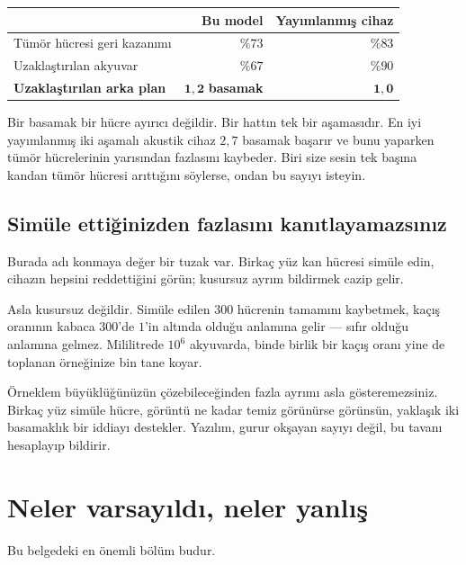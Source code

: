 \documentclass[11pt,a4paper]{article}
\begin{document}
\begin{center}\small
\begin{tabular}{lrr}
\toprule
& Bu model & Yayımlanmış cihaz \\
\midrule
Tümör hücresi geri kazanımı & $\%73$ & $\%83$ \\
Uzaklaştırılan akyuvar & $\%67$ & $\%90$ \\
\textbf{Uzaklaştırılan arka plan} & $\mathbf{1,2}$ \textbf{basamak}
& $\mathbf{1,0}$ \\
\bottomrule
\end{tabular}
\end{center}

\begin{plain}
Bir basamak bir hücre ayırıcı değildir. Bir hattın tek bir aşamasıdır. En iyi
yayımlanmış iki aşamalı akustik cihaz $2,7$ basamak başarır ve bunu yaparken
tümör hücrelerinin yarısından fazlasını kaybeder. Biri size sesin tek başına
kandan tümör hücresi arıttığını söylerse, ondan bu sayıyı isteyin.
\end{plain}

\subsection*{Simüle ettiğinizden fazlasını kanıtlayamazsınız}

Burada adı konmaya değer bir tuzak var. Birkaç yüz kan hücresi simüle edin,
cihazın hepsini reddettiğini görün; kusursuz ayrım bildirmek cazip gelir.

Asla kusursuz değildir. Simüle edilen 300 hücrenin tamamını kaybetmek, kaçış
oranının kabaca $300$'de $1$'in altında olduğu anlamına gelir --- sıfır olduğu
anlamına gelmez. Mililitrede $10^6$ akyuvarda, binde birlik bir kaçış oranı yine
de toplanan örneğinize bin tane koyar.

\begin{keybox}
Örneklem büyüklüğünüzün çözebileceğinden fazla ayrımı asla gösteremezsiniz.
Birkaç yüz simüle hücre, görüntü ne kadar temiz görünürse görünsün, yaklaşık iki
basamaklık bir iddiayı destekler. Yazılım, gurur okşayan sayıyı değil, bu tavanı
hesaplayıp bildirir.
\end{keybox}

\section{Neler varsayıldı, neler yanlış}
\label{sec:limits}

Bu belgedeki en önemli bölüm budur.
\end{document}
